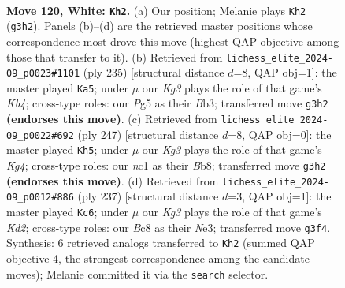 \documentclass[11pt]{article}
\begin{document}
\clearpage

\begin{figure}[p]\centering
\begin{subfigure}{0.46\textwidth}\centering
\resizebox{\linewidth}{!}{%
\newchessgame
\chessboard[
  setfen={2B5/6k1/8/6PP/8/6K1/8/2n5 w - - 9 120},
  showmover=false,
  pgfstyle=straightmove, color=movearrow, markmove={g3-h2}
]}
\caption{}
\end{subfigure}\hfill
\begin{subfigure}{0.46\textwidth}\centering
\resizebox{\linewidth}{!}{%
\newchessgame
\chessboard[
  setfen={8/8/8/1k6/8/pb6/8/1K6 b - - 85 118},
  showmover=false,
  pgfstyle=straightmove, color=movearrow, markmove={b5-a5}
]}
\caption{}
\end{subfigure}
\\[4pt]
\begin{subfigure}{0.46\textwidth}\centering
\resizebox{\linewidth}{!}{%
\newchessgame
\chessboard[
  setfen={1b6/8/8/6k1/8/7p/8/6K1 b - - 19 124},
  showmover=false,
  pgfstyle=straightmove, color=movearrow, markmove={g5-h5}
]}
\caption{}
\end{subfigure}\hfill
\begin{subfigure}{0.46\textwidth}\centering
\resizebox{\linewidth}{!}{%
\newchessgame
\chessboard[
  setfen={8/3k4/6N1/2p5/p7/2K1n3/8/8 b - - 15 119},
  showmover=false,
  pgfstyle=straightmove, color=movearrow, markmove={d7-c6}
]}
\caption{}
\end{subfigure}
\caption{\textbf{Move 120, White: \texttt{Kh2}.} (a) Our position; Melanie plays \texttt{Kh2} (\texttt{g3h2}). Panels (b)--(d) are the retrieved master positions whose correspondence most drove this move (highest QAP objective among those that transfer to it). (b) Retrieved from \texttt{lichess\_elite\_2024-09\_p0023\#1101} (ply 235) [structural distance $d$=8, QAP obj=1]: the master played \texttt{Ka5}; under $\mu$ our \emph{Kg3} plays the role of that game's \emph{Kb4}; cross-type roles: our \emph{P}g5 as their \emph{B}b3; transferred move \texttt{g3h2} \textbf{(endorses this move)}. (c) Retrieved from \texttt{lichess\_elite\_2024-09\_p0022\#692} (ply 247) [structural distance $d$=8, QAP obj=0]: the master played \texttt{Kh5}; under $\mu$ our \emph{Kg3} plays the role of that game's \emph{Kg4}; cross-type roles: our \emph{n}c1 as their \emph{B}b8; transferred move \texttt{g3h2} \textbf{(endorses this move)}. (d) Retrieved from \texttt{lichess\_elite\_2024-09\_p0012\#886} (ply 237) [structural distance $d$=3, QAP obj=1]: the master played \texttt{Kc6}; under $\mu$ our \emph{Kg3} plays the role of that game's \emph{Kd2}; cross-type roles: our \emph{B}c8 as their \emph{N}e3; transferred move \texttt{g3f4}. Synthesis: 6 retrieved analogs transferred to \texttt{Kh2} (summed QAP objective 4, the strongest correspondence among the candidate moves); Melanie committed it via the \texttt{search} selector.}
\label{fig:thought-m238}
\end{figure}
\end{document}
